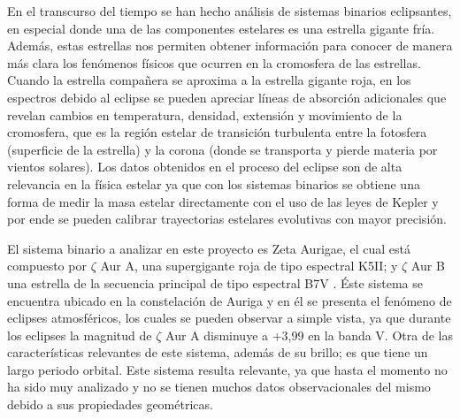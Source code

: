 \documentclass[11pt]{article}
\begin{document}
\noindent En el transcurso del tiempo se han hecho análisis de sistemas binarios eclipsantes, en especial donde una de las componentes estelares es una estrella gigante fría. Además, estas estrellas nos permiten obtener información para conocer de manera más clara los fenómenos físicos que ocurren en la cromosfera de las estrellas. Cuando la estrella compañera se aproxima a la estrella gigante roja, en los espectros debido al eclipse se pueden apreciar líneas de absorción adicionales que revelan cambios en temperatura, densidad, extensión y movimiento de la cromosfera, que es la región estelar de transición turbulenta entre la fotosfera (superficie de la estrella) y la corona (donde se transporta y pierde materia por vientos solares). Los datos obtenidos en el proceso del eclipse son de alta relevancia en la física estelar ya que con los sistemas binarios se obtiene una forma de medir la masa estelar directamente con el uso de las leyes de Kepler y por ende se pueden calibrar trayectorias estelares evolutivas con mayor precisión. 

\noindent El sistema binario a analizar en este proyecto es Zeta Aurigae, el cual está compuesto por $\zeta$ Aur A, una supergigante roja de tipo espectral K5II; y $\zeta$ Aur B una estrella de la secuencia principal de tipo espectral B7V \cite{shenavrin2011vizier}. Éste sistema se encuentra ubicado en la constelación de Auriga  y en él se presenta el fenómeno de eclipses atmosféricos, los cuales se pueden observar a simple vista, ya que durante los eclipses la magnitud de $\zeta$ Aur A disminuye a +3,99 en la banda V. Otra de las características relevantes de este sistema, además de su brillo; es que tiene un largo periodo orbital. Este sistema resulta relevante, ya que hasta el momento no ha sido muy analizado y no se tienen muchos datos observacionales del mismo debido a sus propiedades geométricas.
\vspace{2mm}
\end{document}
